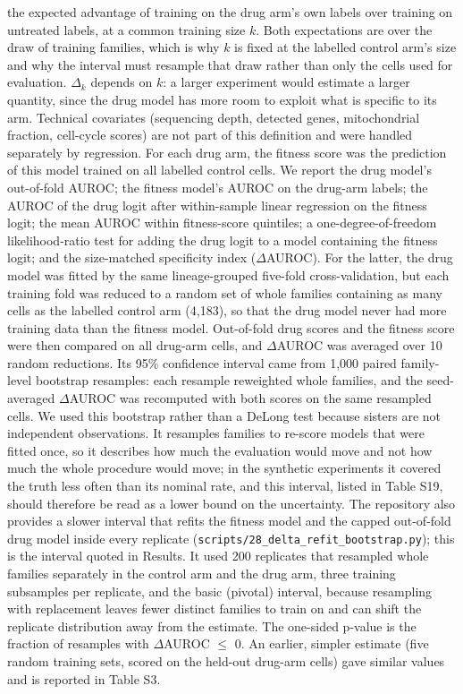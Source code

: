 \documentclass[11pt,a4paper]{article}
\begin{document}
the expected advantage of training on the drug arm's own labels over training on untreated labels, at a common training size $k$. Both expectations are over the draw of training families, which is why $k$ is fixed at the labelled control arm's size and why the interval must resample that draw rather than only the cells used for evaluation. $\Delta_k$ depends on $k$: a larger experiment would estimate a larger quantity, since the drug model has more room to exploit what is specific to its arm. Technical covariates (sequencing depth, detected genes, mitochondrial fraction, cell-cycle scores) are not part of this definition and were handled separately by regression. For each drug arm, the fitness score was the prediction of this model trained on all labelled control cells. We report the drug model's out-of-fold AUROC; the fitness model's AUROC on the drug-arm labels; the AUROC of the drug logit after within-sample linear regression on the fitness logit; the mean AUROC within fitness-score quintiles; a one-degree-of-freedom likelihood-ratio test for adding the drug logit to a model containing the fitness logit; and the size-matched specificity index ($\Delta$AUROC). For the latter, the drug model was fitted by the same lineage-grouped five-fold cross-validation, but each training fold was reduced to a random set of whole families containing as many cells as the labelled control arm (4,183), so that the drug model never had more training data than the fitness model. Out-of-fold drug scores and the fitness score were then compared on all drug-arm cells, and $\Delta$AUROC was averaged over 10 random reductions. Its 95\% confidence interval came from 1,000 paired family-level bootstrap resamples: each resample reweighted whole families, and the seed-averaged $\Delta$AUROC was recomputed with both scores on the same resampled cells. We used this bootstrap rather than a DeLong test because sisters are not independent observations. It resamples families to re-score models that were fitted once, so it describes how much the evaluation would move and not how much the whole procedure would move; in the synthetic experiments it covered the truth less often than its nominal rate, and this interval, listed in Table S19, should therefore be read as a lower bound on the uncertainty. The repository also provides a slower interval that refits the fitness model and the capped out-of-fold drug model inside every replicate (\texttt{scripts/28\_delta\_refit\_bootstrap.py}); this is the interval quoted in Results. It used 200 replicates that resampled whole families separately in the control arm and the drug arm, three training subsamples per replicate, and the basic (pivotal) interval, because resampling with replacement leaves fewer distinct families to train on and can shift the replicate distribution away from the estimate. The one-sided p-value is the fraction of resamples with $\Delta$AUROC $\leq$ 0. An earlier, simpler estimate (five random training sets, scored on the held-out drug-arm cells) gave similar values and is reported in Table S3.
\end{document}
